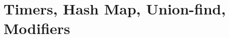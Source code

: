 \chapter{Timers, Hash Map, Union-find, Modifiers}
\label{chapterTimer}
\label{chap:Miscellany}









